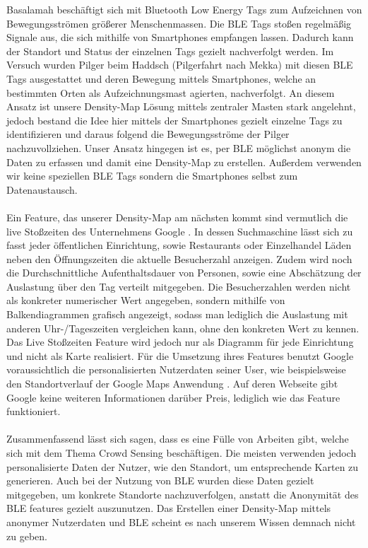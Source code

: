\documentclass[conference]{IEEEtran}
\begin{document}
Basalamah \cite{BLETags} beschäftigt sich mit Bluetooth Low Energy Tags zum Aufzeichnen von Bewegungsströmen größerer Menschenmassen. 
Die BLE Tags stoßen regelmäßig Signale aus, die sich mithilfe von Smartphones empfangen lassen. 
Dadurch kann der Standort und Status der einzelnen Tags gezielt nachverfolgt werden. 
Im Versuch wurden Pilger beim Haddsch (Pilgerfahrt nach Mekka) mit diesen BLE Tags ausgestattet und deren Bewegung mittels Smartphones, welche an bestimmten Orten als Aufzeichnungsmast agierten, nachverfolgt. 
An diesem Ansatz ist unsere Density-Map Lösung mittels zentraler Masten stark angelehnt, jedoch bestand die Idee hier mittels der Smartphones gezielt einzelne Tags zu identifizieren und daraus folgend die Bewegungsströme der Pilger nachzuvollziehen. 
Unser Ansatz hingegen ist es, per BLE möglichst anonym die Daten zu erfassen und damit eine Density-Map zu erstellen. 
Außerdem verwenden wir keine speziellen BLE Tags sondern die Smartphones selbst zum Datenaustausch. \\
\\
Ein Feature, das unserer Density-Map am nächsten kommt sind vermutlich die live Stoßzeiten des Unternehmens Google \cite{GoogleStosszeiten}.  
In dessen Suchmaschine lässt sich zu fasst jeder öffentlichen Einrichtung, sowie Restaurants oder Einzelhandel Läden neben den Öffnungszeiten die aktuelle Besucherzahl anzeigen. 
Zudem wird noch die Durchschnittliche Aufenthaltsdauer von Personen, sowie eine Abschätzung der Auslastung über den Tag verteilt mitgegeben. 
Die Besucherzahlen werden nicht als konkreter numerischer Wert angegeben, sondern mithilfe von Balkendiagrammen grafisch angezeigt, sodass man lediglich die Auslastung mit anderen Uhr-/Tageszeiten vergleichen kann, ohne den konkreten Wert zu kennen. 
Das Live Stoßzeiten Feature wird jedoch nur als Diagramm für jede Einrichtung und nicht als Karte realisiert.
Für die Umsetzung ihres Features benutzt Google voraussichtlich die personalisierten Nutzerdaten seiner User, wie beispielsweise den Standortverlauf der Google Maps Anwendung \cite{GoogleStandortverlauf}. 
Auf deren Webseite gibt Google keine weiteren Informationen darüber Preis, lediglich wie das Feature funktioniert. \\
\\
Zusammenfassend lässt sich sagen, dass es eine Fülle von Arbeiten gibt, welche sich mit dem Thema Crowd Sensing beschäftigen. 
Die meisten verwenden jedoch personalisierte Daten der Nutzer, wie den Standort, um entsprechende Karten zu generieren. 
Auch bei der Nutzung von BLE wurden diese Daten gezielt mitgegeben, um konkrete Standorte nachzuverfolgen, anstatt die Anonymität des BLE features gezielt auszunutzen. 
Das Erstellen einer Density-Map mittels anonymer Nutzerdaten und BLE scheint es nach unserem Wissen demnach nicht zu geben. 
\end{document}
